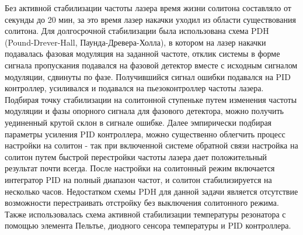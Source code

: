 Без активной стабилизации частоты лазера время жизни солитона составляло от секунды до 20 мин, за это время лазер накачки уходил из области существования солитона. Для долгосрочной стабилизации была использована схема PDH (Pound-Drever-Hall, Паунда-Древера-Холла), в котором на лазер накачки подавалась фазовая модуляция на заданной частоте, отклик системы в форме сигнала пропускания подавался на фазовой детектор вместе с исходным сигналом модуляции, сдвинуты по фазе. Получившийся сигнал ошибки подавался на PID контроллер, усиливался и подавался на пьезоконтроллер частоты лазера. Подбирая точку стабилизации на солитонной ступеньке путем изменения частоты модуляции и фазы опорного сигнала для фазового детектора, можно получить уединенный крутой склон в сигнале ошибке. Далее эмпирически подбирая параметры усиления PID контроллера, можно существенно облегчить процесс настройки на солитон - так при включенной системе обратной связи настройка на солитон путем быстрой перестройки частоты лазера дает положительный результат почти всегда. После настройки на солитонный режим включается интегратор PID на полный диапазон частот, и солитон стабилизируется на несколько часов. Недостатком схемы PDH для данной задачи является отсутствие возможности перестраивать отстройку без выключения солитонного режима. Также использовалась схема активной стабилизации температуры резонатора с помощью элемента Пельтье, диодного сенсора температуры и PID контроллера.



